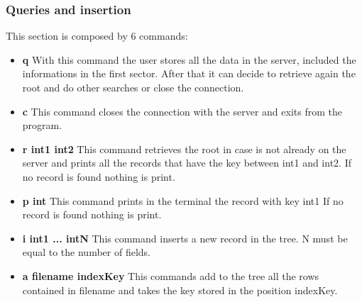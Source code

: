 \subsubsection{Queries and insertion}
This section is composed by 6 commands:
\begin{itemize}
\item\textbf{q}
With this command the user stores all the data in the server, included the informations in the first sector. After that it can decide to retrieve again the root and do other searches or close the connection.
\item\textbf{c}
This command closes the connection with the server and exits from the program.
\item\textbf{r int1 int2}
This command retrieves the root in case is not already on the server and prints all the records that have the key between int1 and int2.
If no record is found nothing is print.
\item\textbf{p int}
This command prints in the terminal the record with key int1
If no record is found nothing is print.
\item\textbf{i int1 ... intN}
This command inserts a new record in the tree. N must be equal to the number of fields.
\item\textbf{a filename indexKey}
This commands add to the tree all the rows contained in filename and takes the key stored in the position indexKey.
\end{itemize}
